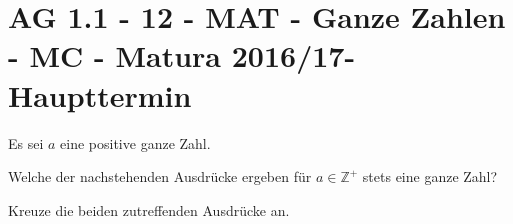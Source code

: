 \section{AG 1.1 - 12 - MAT - Ganze Zahlen - MC - Matura 2016/17-Haupttermin}

\begin{beispiel}[AG 1.1]{1} %
	Es sei $a$ eine positive ganze Zahl.
			
Welche der nachstehenden Ausdrücke ergeben für $a\in \mathbb{Z}^+$ stets eine ganze Zahl? 

Kreuze die beiden zutreffenden Ausdrücke an.

\end{beispiel}